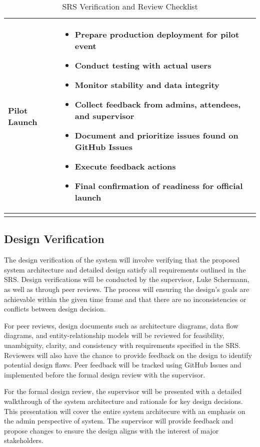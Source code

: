 \documentclass[12pt, titlepage]{article}
\begin{document}
\begin{longtable}{|p{4cm}|p{11cm}|}
\textbf{Pilot Launch} &
\begin{itemize}
  \item Prepare production deployment for pilot event
  \item Conduct testing with actual users
  \item Monitor stability and data integrity
  \item Collect feedback from admins, attendees, and supervisor
  \item Document and prioritize issues found on GitHub Issues
  \item Execute feedback actions
  \item Final confirmation of readiness for official launch
\end{itemize}
\\
\hline

\caption{SRS Verification and Review Checklist}
\label{tab:srs_verification_checklist}
\end{longtable}


\subsection{Design Verification}

The design verification of the system will involve verifying that the proposed system architecture and detailed design satisfy all requirements outlined in the SRS. Design verifications will be conducted by the supervisor, Luke Schermann, as well as through peer reviews. The process will ensuring the design's goals are achievable within the given time frame and that there are no inconsistencies or conflicts between design decision.

For peer reviews, design documents such as architecture diagrams, data flow diagrams, and entity-relationship models will be reviewed for feasibility, unambiguity, clarity, and  consistency with requirements specified in the SRS. Reviewers will also have the chance to provide feedback on the design to identify potential design flaws. Peer feedback will be tracked using GitHub Issues and implemented before the formal design review with the supervisor.

For the formal design review, the supervisor will be presented with a detailed walkthrough of the system architecture and rationale for key design decisions. This presentation will cover the entire system architecure with an emphasis on the admin perspective of system. The supervisor will provide feedback and propose changes to ensure the design aligns with the interest of major stakeholders.
\end{document}
